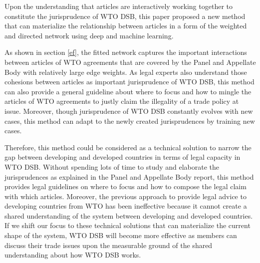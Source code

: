 Upon the understanding that articles are interactively working together to
constitute the jurisprudence of WTO DSB,
this paper proposed a new method that can materialize the relationship between articles
in a form of the weighted and directed network using deep and machine learning.
 
As shown in section \ref{ef}, the fitted network captures the important interactions
between articles of WTO agreements that are covered by the Panel and Appellate Body with relatively large edge weights.
As legal experts also understand those cohesions between articles as important jurisprudence of WTO DSB,
this method can also provide a general guideline about where to focus and how to mingle the articles of WTO agreements to justly claim
the illegality of a trade policy at issue. 
Moreover, though jurisprudence of WTO DSB constantly
evolves with new cases, this method can adapt to the newly created jurisprudences by training new cases.
 
Therefore, this method could be considered as a technical solution to narrow the gap between developing and developed countries in terms of legal capacity in WTO DSB.
Without spending lots of time to study and elaborate the jurisprudences as explained in the Panel and Appellate Body report, this method provides legal guidelines on where to focus and how to compose the legal claim with which articles.
Moreover, the previous approach to provide legal advice to developing countries from WTO has been ineffective because it cannot create a shared understanding of the system between developing and developed countries.
If we shift our focus to these technical solutions that can materialize the current shape of the system, WTO DSB
will become more effective as members can discuss their trade issues upon the measurable ground of the shared understanding about how WTO DSB works.

